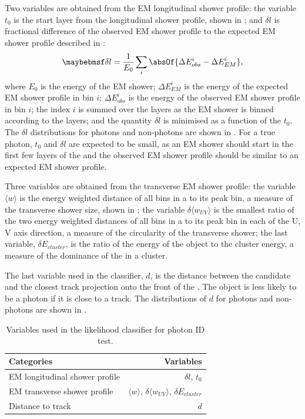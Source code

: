 Two variables are obtained from the EM longitudinal shower profile: the variable $t_0$ is the start layer from the longitudinal shower profile, shown in ; and $\delta{l}$ is fractional difference of the observed EM shower profile to the expected EM shower profile described in :
\begin{equation}
\delta l = \frac{1}{E_0}\sum_{i}^{}\absOf{\Delta E_{obs}^i - \Delta E_{EM}^i },
\end{equation}
where $E_0$ is the energy of the EM shower; $\Delta E_{EM}^i$ is the energy of the expected EM shower profile in bin $i$;  $\Delta E_{obs}^i$ is the energy of the observed EM shower profile in bin $i$; the index $i$ is summed over the \ECAL layers as the EM shower is binned according to the \ECAL layers; and the quantity $\delta l$ is minimised as a function of the $t_0$. The $\delta l$ distributions for photons and non-photons are shown in . For a true photon, $t_0$  and $\delta l $ are expected to be small, as an EM shower should start in the first few layers of the \ECAL and the observed EM shower profile should be similar to an expected EM shower profile.

Three variables are obtained from the transverse EM shower profile: the variable $\langle{w}\rangle$ is the energy weighted \rms distance of all bins in a \ShowerPeak to its peak bin, a measure of the transverse shower size, shown in ; the variable $\delta{\langle{w_{UV}}\rangle}$ is the smallest ratio of the two energy weighted \rms distances of all bins in a \ShowerPeak to its peak bin in each of the U, V axis direction, a measure of the circularity of the transverse shower; the last variable, $\delta E_{cluster}$, is the  ratio of the energy of the \ShowerPeak object to the cluster energy, a measure of the dominance of the \ShowerPeak in a cluster.

The last variable used in the classifier, $d$, is the distance between the candidate and the closest track projection onto the front of the \ECAL. The \ShowerPeak object is less likely to be a photon if it is close to a track. The distributions of $d$ for photons and non-photons are shown in .


\begin{table}[htbp] \centering \smallskip
\begin{tabular}{l r }
\hline
\hline
Categories&  Variables\\
\hline
EM longitudinal  shower profile & $\delta{l}$, $t_0$ \\
EM transverse  shower profile & $\langle{w}\rangle$, $\delta{\langle{w_{UV}}\rangle}$, $\delta E_{cluster}$ \\
Distance to track &  $d$ \\
\hline
\hline
\end{tabular}
\caption
{Variables used in the likelihood classifier for photon ID test.}
\label{tab:photonPhotonIDvar}
\end{table}

